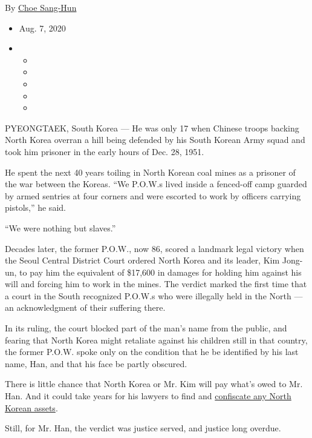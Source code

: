 By \href{https://www.nytimes.com/by/choe-sang-hun}{Choe Sang-Hun}

\begin{itemize}
\item
  Aug. 7, 2020
\item
  \begin{itemize}
  \item
  \item
  \item
  \item
  \item
  \end{itemize}
\end{itemize}

PYEONGTAEK, South Korea --- He was only 17 when Chinese troops backing
North Korea overran a hill being defended by his South Korean Army squad
and took him prisoner in the early hours of Dec. 28, 1951.

He spent the next 40 years toiling in ​North Korean ​coal mines as a
prisoner of the war between the Koreas. ``We P.O.W.s lived inside a
fenced-off camp guarded by armed sentries at four corners and were
escorted to work by officers carrying pistols,'' he said.

``We were nothing but slaves.''

Decades later, the former P.O.W., now 86, scored a landmark legal
victory when the Seoul Central District Court ordered North Korea and
its leader, Kim Jong-un, to pay him the equivalent of \$17,600 in
damages for holding him against his will ​and ​forcing him to work in
the mines. ​ The verdict marked the first time that a court in the South
recognized P.O.W.s who were illegally held in the North --- an
acknowledgment of their suffering there.

In its ruling, the court blocked part of the man's name from the public,
and fearing that North Korea might retaliate against ​his children still
in that country, the former P.O.W. spoke only on the condition that he
be identified by his last name, Han, and that his face be partly
obscured.

There is little chance that North Korea or Mr. Kim will pay what's owed
to Mr. Han. And it could take years for his lawyers to find and
\href{https://www.nbcnews.com/news/us-news/seized-north-korean-cargo-ship-awarded-united-states-n1069761}{confiscate
any North Korean assets}.

Still, for Mr. Han, the verdict was justice served, and justice long
overdue.

